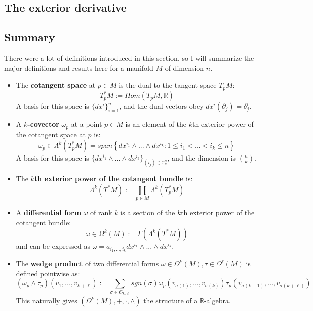 \documentclass[11pt, oneside]{article}   	%
\theoremstyle{definition}
\begin{document}
\subsection{The exterior derivative}

\subsection{Summary}

There were a lot of definitions introduced in this section, so I will summarize the major definitions and results here for a 
manifold $M$ of dimension $n$.
\begin{itemize}
	\item The \textbf{cotangent space} at $p\in M$ is the dual to the tangent space $T_p M$:
	\begin{equation}
		T_p^* M := Hom(T_p M, \mathbb R)
	\end{equation}
	A basis for this space is $\{dx^i\}_{i = 1}^n$, and the dual vectors obey $dx^i(\partial_j) = \delta^i_j$. 
	
	\item A \textbf{$k$-covector} $\omega_p$ at a point $p\in M$ is an element of the $k$th exterior power of the cotangent 
	space at $p$ is: 
	\begin{equation}
		\omega_p\in\Lambda^k\left(T_p^* M\right) = span\left\{dx^{i_1}\wedge ...\wedge dx^{i_k} : 1\leq i_1 < ... < i_k\leq n 
		\right\}
	\end{equation}
	A basis for this space is $\{dx^{i_1}\wedge ...\wedge dx^{i_k}\}_{(i_j)\in\mathfrak I_k^n}$, and the dimension is $n\choose 
	k$. 
	
	\item The \textbf{$k$th exterior power of the cotangent bundle} is:
	\begin{equation}
		\Lambda^k\left(T^* M\right) :=\coprod_{p\in M}\Lambda^k\left(T_p^* M\right)
	\end{equation}
	
	\item A \textbf{differential form} $\omega$ of rank $k$ is a section of the $k$th exterior power of the cotangent bundle:
	\begin{equation}
		\omega\in\Omega^k(M) := \Gamma(\Lambda^k(T^* M))
	\end{equation}
	and can be expressed as $\omega = a_{i_1, ..., i_k} dx^{i_1}\wedge ...\wedge dx^{i_k}$. 
	
	\item The \textbf{wedge product} of two differential forms $\omega\in\Omega^k(M), \tau\in\Omega^\ell(M)$ is defined 
	pointwise as:
	\begin{equation}
		(\omega_p\wedge\tau_p)(v_1, ..., v_{k + \ell}) := \sum_{\sigma\in\mathfrak S_{k, \ell}} sgn(\sigma)
		\omega_p(v_{\sigma(1)}, ..., v_{\sigma(k)})\tau_p(v_{\sigma(k + 1)}, ..., v_{\sigma(k + \ell)})
	\end{equation}
	This naturally gives $(\Omega^k(M), +, \cdot, \wedge)$ the structure of a $\mathbb R$-algebra. 
	

\end{itemize}
\end{document}
